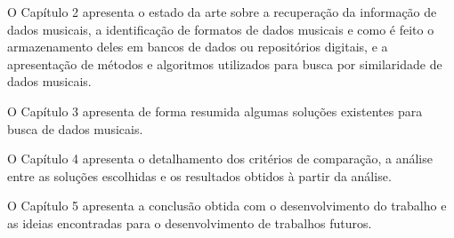 O Capítulo 2 apresenta o estado da arte sobre a recuperação da informação de dados musicais, a identificação de formatos de dados musicais e como é feito o armazenamento deles em bancos de dados ou repositórios digitais, e a apresentação de métodos e algoritmos utilizados para busca por similaridade de dados musicais.

O Capítulo 3 apresenta de forma resumida algumas soluções existentes para busca de dados musicais.

O Capítulo 4 apresenta o detalhamento dos critérios de comparação, a análise entre as soluções escolhidas e os resultados obtidos à partir da análise.

O Capítulo 5 apresenta a conclusão obtida com o desenvolvimento do trabalho e as ideias encontradas para o desenvolvimento de trabalhos futuros.